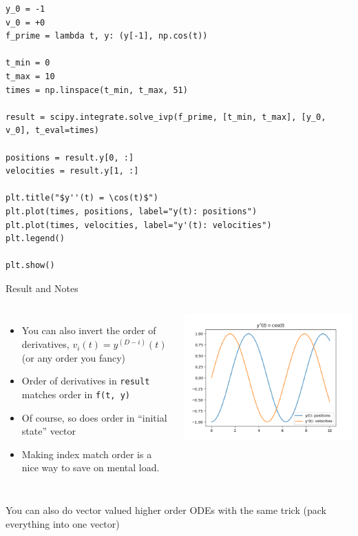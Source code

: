 \begin{frame}[fragile]
%
\begin{codebox}[Second Order ODE: $y'' {=} \cos(t)$]
\begin{verbatim}
y_0 = -1
v_0 = +0
f_prime = lambda t, y: (y[-1], np.cos(t))

t_min = 0
t_max = 10
times = np.linspace(t_min, t_max, 51)

result = scipy.integrate.solve_ivp(f_prime, [t_min, t_max], [y_0, v_0], t_eval=times)

positions = result.y[0, :]
velocities = result.y[1, :]

plt.title("$y''(t) = \cos(t)$")
plt.plot(times, positions, label="y(t): positions")
plt.plot(times, velocities, label="y'(t): velocities")
plt.legend()

plt.show()
\end{verbatim}
\end{codebox}
%
\end{frame}


\begin{frame}{Result and Notes}
%
\begin{columns}
\begin{itemize}
\item You can also invert the order of derivatives, \ie $v_i(t) = y^{(D-i)}(t)$ (or any order you fancy)
\item Order of derivatives in \texttt{result} matches order in \texttt{f(t, y)}
\item Of course, so does order in \enquote{initial state} vector
\item Making index match order is a nice way to save on mental load.
\end{itemize}
%
\includegraphics[width=\linewidth]{./gfx/07-ODE-second-degree}
\end{columns}
%
\begin{hintbox}
\footnotesize
You can also do vector valued higher order ODEs with the same trick (pack everything into one vector)
\end{hintbox}
%
\end{frame}

